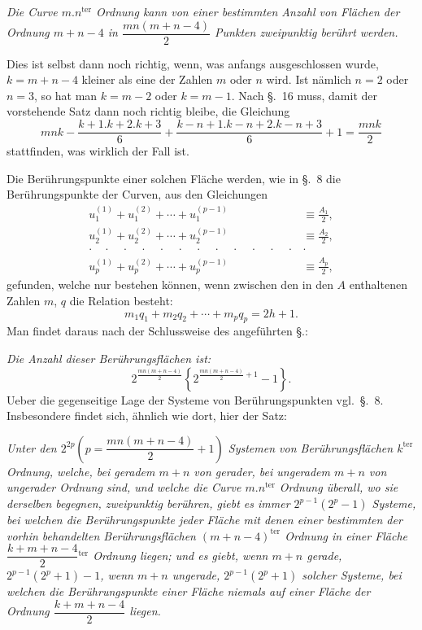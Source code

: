 \documentclass{article}
\begin{document}
\emph{Die Curve $m.n^{\text{ter}}$ Ordnung kann von einer bestimmten Anzahl von Flächen der Ordnung $m+n-4$ in $\dfrac{mn(m+n-4)}{2}$ Punkten zweipunktig berührt werden.}

Dies ist selbst dann noch richtig, wenn, was anfangs ausgeschlossen wurde, $k = m+n-4$ kleiner als eine der Zahlen $m$ oder $n$ wird. Ist nämlich $n=2$ oder $n=3$, so hat man $k=m-2$ oder $k=m-1$. Nach §.~16 muss, damit der vorstehende Satz dann noch richtig bleibe, die Gleichung
\[
mnk-\frac{k+1.k+2.k+3}{6}+\frac{k-n+1.k-n+2.k-n+3}{6}+1 = \frac{mnk}{2}
\]
stattfinden, was wirklich der Fall ist.

Die Berührungspunkte einer solchen Fläche werden, wie in §.~8 die Berührungspunkte der Curven, aus den Gleichungen
\[
\begin{aligned}
u_{1}^{(1)}+u_{1}^{(2)}+\cdots+u_{1}^{(p-1)} &\equiv \frac{A_{1}}{2},\\
u_{2}^{(1)}+u_{2}^{(2)}+\cdots+u_{2}^{(p-1)} &\equiv \frac{A_{2}}{2},\\
\cdot\quad\cdot\quad\cdot\quad\cdot\quad\cdot\quad\cdot\quad\cdot\quad\cdot\quad\cdot\quad\cdot\quad\cdot\quad\cdot & \cdot\\
u_{p}^{(1)}+u_{p}^{(2)}+\cdots+u_{p}^{(p-1)} &\equiv \frac{A_{p}}{2},
\end{aligned}
\]
gefunden, welche nur bestehen können, wenn zwischen den in den $A$ enthaltenen Zahlen $m$, $q$ die Relation besteht:
\[
m_{1}q_{1}+m_{2}q_{2}+\cdots+m_{p}q_{p} = 2h+1.
\]
Man findet daraus nach der Schlussweise des angeführten §.:


\emph{Die Anzahl dieser Berührungsflächen ist:}
\[
2^{\frac{mn(m+n-4)}{2}}\left\{2^{\frac{mn(m+n-4)}{2}+1}-1\right\}.
\]
Ueber die gegenseitige Lage der Systeme von Berührungspunkten vgl.\ §.~8. Insbesondere findet sich, ähnlich wie dort, hier der Satz:

\emph{Unter den $2^{2p}\left(p = \dfrac{mn(m+n-4)}{2}+1\right)$ Systemen von Berührungsflächen $k^{\text{ter}}$ Ordnung, welche, bei geradem $m+n$ von gerader, bei ungeradem $m+n$ von ungerader Ordnung sind, und welche die Curve $m.n^{\text{ter}}$ Ordnung überall, wo sie derselben begegnen, zweipunktig berühren, giebt es immer $2^{p-1}(2^{p}-1)$ Systeme, bei welchen die Berührungspunkte jeder Fläche mit denen einer bestimmten der vorhin behandelten Berührungsflächen $(m+n-4)^{\text{ter}}$ Ordnung in einer Fläche $\dfrac{k+m+n-4}{2}{}^{\text{ter}}$ Ordnung liegen; und es giebt, wenn $m+n$ gerade, $2^{p-1}(2^{p}+1)-1$, wenn $m+n$ ungerade, $2^{p-1}(2^{p}+1)$ solcher Systeme, bei welchen die Berührungspunkte einer Fläche niemals auf einer Fläche der Ordnung $\dfrac{k+m+n-4}{2}$ liegen.}
\end{document}
